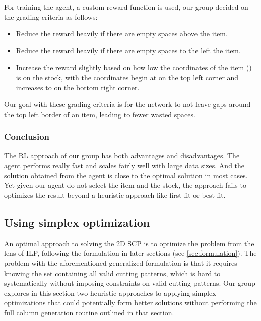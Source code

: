 \documentclass[a4paper]{article}
\begin{document}
    \vspace{0.2cm}
    For training the agent, a custom reward function is used, our group decided on the grading criteria as follows:
    \begin{itemize}
        \item Reduce the reward heavily if there are empty spaces above the item.
        \item Reduce the reward heavily if there are empty spaces to the left the item.
        \item Increase the reward slightly based on how low the coordinates of the item (\boldmath{$[x, y]$}) is on the stock, with the coordinates begin at \boldmath{$[0, 0]$} on the top left corner and increases to \boldmath{$[W_s, H_s]$} on the bottom right corner. 
    \end{itemize}
    \vspace{0.2cm}
    Our goal with these grading criteria is for the network to not leave gaps around the top left border of an item, leading to fewer wasted spaces.
    \subsubsection{Conclusion}
    The RL approach of our group has both advantages and disadvantages. The agent performs really fast and scales fairly well with large data sizes. And the solution obtained from the agent is close to the optimal solution in most cases. Yet given our agent do not select the item and the stock, the approach fails to optimizes the result beyond a heuristic approach like first fit or best fit.

    \subsection{Using simplex optimization}
    An optimal approach to solving the 2D SCP is to optimize the problem from the lens of ILP, following the formulation in later sections (see \ref{sec:formulation}). The problem with the aforementioned generalized formulation is that it requires knowing the set  containing all valid cutting patterns, which is hard to systematically without imposing constraints on valid cutting patterns. Our group explores in this section two heuristic approaches to applying simplex optimizations that could potentially form better solutions without performing the full column generation routine outlined in that section.
\end{document}
